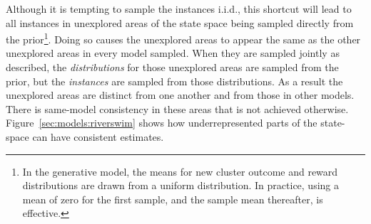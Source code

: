 Although it is tempting to sample the instances i.i.d., this shortcut will lead to all instances in unexplored areas of the state space being sampled directly from the prior\footnote{In the generative model, the means for new cluster outcome and reward distributions are drawn from a uniform distribution. In practice, using a mean of zero for the first sample, and the sample mean thereafter, is effective.}. Doing so causes the unexplored areas to appear the same as the other unexplored areas in every model sampled. When they are sampled jointly as described, the \emph{distributions} for those unexplored areas are sampled from the prior, but the \emph{instances} are sampled from those distributions. As a result the unexplored areas are distinct from one another and from those in other models. There is same-model consistency in these areas that is not achieved otherwise. Figure~\ref{sec:models:riverswim} shows how underrepresented parts of the state-space can have consistent estimates.



